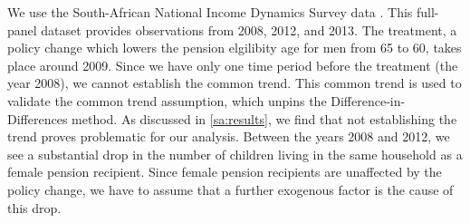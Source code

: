 \begin{refsection}
We use the South-African National Income Dynamics Survey data
\parencite[in collaboration with The World Bank]{saldru2008nids,saldru2012nids,saldru2013nids}.
This full-panel dataset provides observations from 2008, 2012, and 2013.
The treatment, a policy change which lowers the pension elgilibity age for men from 65 to 60, takes place around 2009.
Since we have only one time period before the treatment (the year 2008), we cannot establish the common trend.
This common trend is used to validate the common trend assumption, which unpins the Difference-in-Differences method.
As discussed in \autoref{sa:results}, we find that not establishing the trend proves problematic for our analysis.
Between the years 2008 and 2012,
we see a substantial drop in the number of children living in the same household as a female pension recipient.
Since female pension recipients are unaffected by the policy change, we have to assume that a further exogenous factor is the cause of this drop.






\printbibliography
\end{refsection}